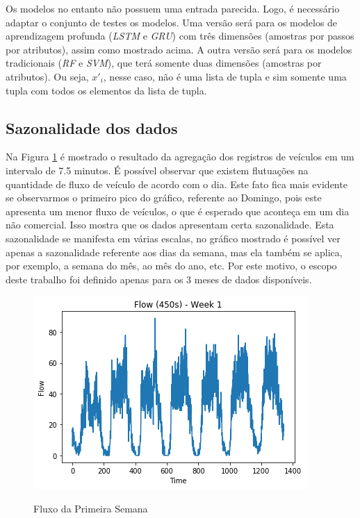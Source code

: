 Os modelos no entanto não possuem uma entrada parecida. Logo, é necessário adaptar o conjunto de testes os modelos. Uma versão será para os modelos de aprendizagem profunda (\textit{\acrshort{LSTM}} e \textit{\acrshort{GRU}}) com três dimensões (amostras por passos por atributos), assim como mostrado acima. A outra versão será para os modelos tradicionais (\textit{\acrshort{RF}} e \textit{\acrshort{SVM}}), que terá somente duas dimensões (amostras por atributos). Ou seja, \(x'_i\), nesse caso, não é uma lista de tupla e sim somente uma tupla com todos os elementos da lista de tupla.

\subsection{Sazonalidade dos dados}

Na Figura \ref{figure:flow_discution} é mostrado o resultado da agregação dos registros de veículos em um intervalo de 7.5 minutos. É possível observar que existem flutuações na quantidade de fluxo de veículo de acordo com o dia. Este fato fica mais evidente se observarmos o primeiro pico do gráfico, referente ao Domingo, pois este apresenta um menor fluxo de veículos, o que é esperado que aconteça em um dia não comercial. Isso mostra que os dados apresentam certa sazonalidade. Esta sazonalidade se manifesta em várias escalas, no gráfico mostrado é possível ver apenas a sazonalidade referente aos dias da semana, mas ela também se aplica, por exemplo, a semana do mês, ao mês do ano, etc. Por este motivo, o escopo deste trabalho foi definido apenas para os 3 meses de dados disponíveis. 


\begin{figure}
    \centering
    \includegraphics[scale=1]{monography/img/flows/flow_450_week_01.png}
    \label{figure:flow_discution}
    \caption[Fluxo da Primeira Semana]{Fluxo da Primeira Semana}
\end{figure}

